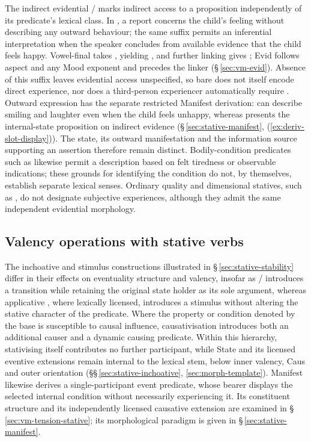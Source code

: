 The indirect evidential / marks indirect access to a
proposition independently of its predicate's lexical class. In  , a report concerns the child's
feeling without describing any outward behaviour; the same suffix permits
an inferential interpretation when the speaker concludes from available
evidence that the child feels happy. Vowel-final  takes
, yielding , and further linking gives
; Evid follows aspect and any Mood exponent and precedes the
linker (§\,\ref{sec:vm-evid}). Absence of this suffix leaves evidential
access unspecified, so bare  does not itself encode direct
experience, nor does a third-person experiencer automatically require
. Outward expression has the separate restricted Manifest
derivation:   can
describe smiling and laughter even when the child feels unhappy, whereas
 presents the internal-state proposition on indirect
evidence (§\,\ref{sec:stative-manifest}, (\ref{ex:deriv-slot-display})).
The state, its outward manifestation and the information source supporting
an assertion therefore remain distinct. Bodily-condition predicates such as
  likewise permit a description based on felt
tiredness or observable indications; these grounds for identifying the
condition do not, by themselves, establish separate lexical senses.
Ordinary quality and dimensional statives, such as 
, do not designate subjective experiences, although they admit
the same independent evidential morphology.

\subsection{Valency operations with stative verbs}\label{sec:stative-valency}

The inchoative and stimulus constructions illustrated in
§\,\ref{sec:stative-stability} differ in their effects on eventuality
structure and valency, insofar as / introduces a
transition while retaining the original state holder as its sole argument,
whereas applicative , where lexically licensed, introduces a
stimulus without altering the stative character of the predicate. Where the
property or condition denoted by the base is susceptible to causal
influence, causativisation introduces both an additional causer and a
dynamic causing predicate. Within this hierarchy, stativising 
itself contributes no further participant, while State and its licensed
eventive extensions remain internal to the lexical stem, below inner valency,
Caus and outer orientation
(§§\,\ref{sec:stative-inchoative}, \ref{sec:morph-template}). Manifest
likewise derives a single-participant event predicate, whose bearer displays
the selected internal condition without necessarily experiencing it. Its
constituent structure and its independently licensed causative extension are
examined in §\,\ref{sec:vm-tension-stative}; its morphological paradigm
is given in §\,\ref{sec:stative-manifest}.

